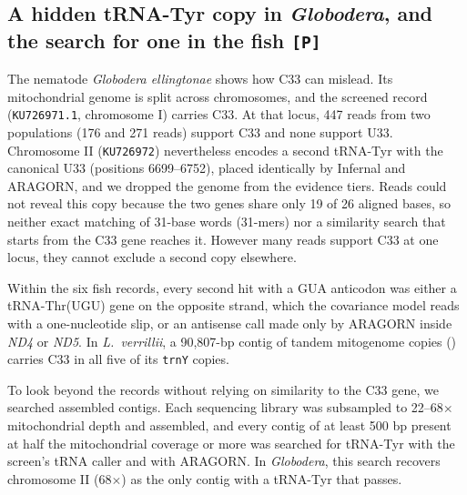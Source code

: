 \documentclass[11pt, a4paper]{article}
\begin{document}
\subsection{A hidden tRNA-Tyr copy in \textit{Globodera}, and the search for one in the fish \texttt{[P]}}\label{sec:glob}
The nematode \textit{Globodera ellingtonae} shows how C33 can mislead. Its mitochondrial genome is split across chromosomes, and the screened record (\texttt{KU726971.1}, chromosome I) carries C33. At that locus, 447 reads from two populations (176 and 271 reads) support C33 and none support U33. Chromosome II (\texttt{KU726972}) nevertheless encodes a second tRNA-Tyr with the canonical U33 (positions 6699--6752), placed identically by Infernal and ARAGORN, and we dropped the genome from the evidence tiers. Reads could not reveal this copy because the two genes share only 19 of 26 aligned bases, so neither exact matching of 31-base words (31-mers) nor a similarity search that starts from the C33 gene reaches it. However many reads support C33 at one locus, they cannot exclude a second copy elsewhere.

Within the six fish records, every second hit with a GUA anticodon was either a tRNA-Thr(UGU) gene on the opposite strand, which the covariance model reads with a one-nucleotide slip, or an antisense call made only by ARAGORN inside \textit{ND4} or \textit{ND5}. In \textit{L.\ verrillii}, a 90,807-bp contig of tandem mitogenome copies () carries C33 in all five of its \texttt{trnY} copies.

To look beyond the records without relying on similarity to the C33 gene, we searched assembled contigs. Each sequencing library was subsampled to 22--68$\times$ mitochondrial depth and assembled, and every contig of at least 500 bp present at half the mitochondrial coverage or more was searched for tRNA-Tyr with the screen's tRNA caller and with ARAGORN. In \textit{Globodera}, this search recovers chromosome II (68$\times$) as the only contig with a tRNA-Tyr that passes.
\end{document}
